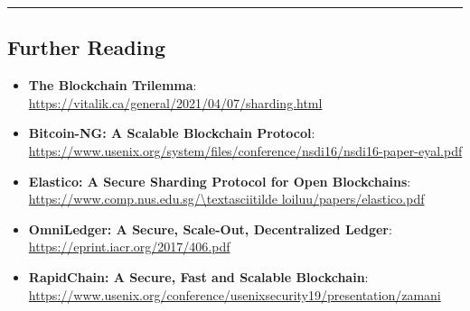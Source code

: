 \begin{center}\rule{0.5\linewidth}{0.5pt}\end{center}

\subsection{Further Reading}\label{further-reading}

\begin{itemize}
\tightlist
\item
  \textbf{The Blockchain Trilemma}:\\
  \url{https://vitalik.ca/general/2021/04/07/sharding.html}
\item
  \textbf{Bitcoin-NG: A Scalable Blockchain Protocol}: \\
  \url{https://www.usenix.org/system/files/conference/nsdi16/nsdi16-paper-eyal.pdf}
\item
  \textbf{Elastico: A Secure Sharding Protocol for Open Blockchains}: \\
  \url{https://www.comp.nus.edu.sg/\textasciitilde loiluu/papers/elastico.pdf}
\item
  \textbf{OmniLedger: A Secure, Scale-Out, Decentralized Ledger}: \\
  \url{https://eprint.iacr.org/2017/406.pdf}
\item
  \textbf{RapidChain: A Secure, Fast and Scalable Blockchain}: \\
  \url{https://www.usenix.org/conference/usenixsecurity19/presentation/zamani}
\end{itemize}